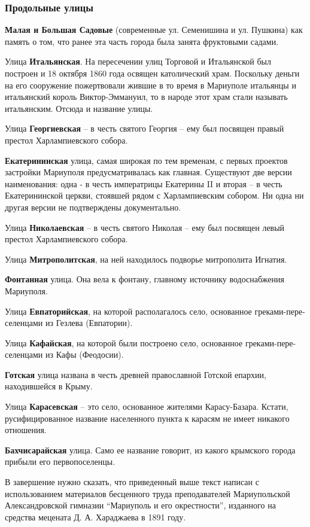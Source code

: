 \subsubsection{Продольные улицы}

\textbf{Малая и Большая Садовые} (современные ул. Семенишина и ул. Пушкина) как память о
том, что ранее эта часть города была занята фруктовыми садами.

Улица \textbf{Итальянская}. На пересечении улиц Торговой и Итальянской был построен  и
18 октября 1860 года освящен католический храм. Поскольку деньги на его
сооружение пожертвовали жившие в то время в Мариуполе итальянцы и итальянский
король Виктор-Эммануил, то в народе этот храм стали называть итальянским.
Отсюда и название улицы.

Улица \textbf{Георгиевская} – в честь святого Георгия – ему был посвящен правый престол
Харлампиевского собора.

\textbf{Екатерининская} улица, самая широкая по тем временам, с первых проектов
застройки Мариуполя предусматривалась как главная. Существуют две версии
наименования: одна - в честь императрицы Екатерины II и вторая – в честь
Екатерининской церкви, стоявшей рядом с Харлампиевским собором. Ни одна ни
другая версии не подтверждены документально.

Улица \textbf{Николаевская} – в честь святого Николая – ему был посвящен левый престол Харлампиевского собора.

Улица \textbf{Митрополитская}, на ней находилось подворье митрополита Игнатия.

\textbf{Фонтанная} улица. Она вела к фонтану, главному источнику водоснабжения Мариуполя.

Улица \textbf{Евпаторийская}, на которой располагалось село, основанное  греками-пере\hyp{}селенцами из Гезлева (Евпатории).

Улица \textbf{Кафайская}, на которой были построено село, основанное  греками-пере\hyp{}селенцами из Кафы (Феодосии).

\textbf{Готская} улица названа в честь древней  православной Готской епархии, находившейся  в Крыму.

Улица \textbf{Карасевская} – это село, основанное жителями Карасу-Базара.
Кстати, русифицированное название населенного пункта к карасям не имеет
никакого отношения.

\textbf{Бахчисарайская} улица. Само ее название говорит, из какого крымского города прибыли его первопоселенцы.

В завершение нужно сказать, что приведенный выше текст написан с использованием
материалов бесценного труда преподавателей Мариупольской Александровской
гимназии \enquote{Мариуполь и его окрестности}, изданного на средства мецената
Д. А. Хараджаева в 1891 году.
